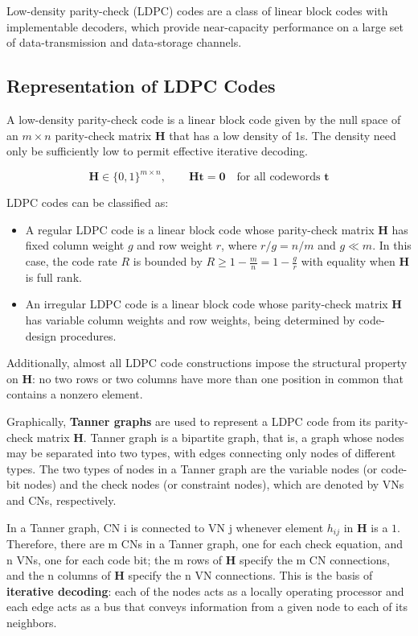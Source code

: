 \documentclass[11pt]{article}
\begin{document}
Low-density parity-check (LDPC) codes are a class of linear block codes with implementable decoders, which provide near-capacity performance on a large set of data-transmission and data-storage channels.

\subsection{Representation of LDPC Codes}

A low-density parity-check code is a linear block code given by the null space of an $m \times n$ parity-check matrix \textbf{H} that has a low density of 1s. The density need only be sufficiently low to permit effective iterative decoding.

\[
    \mathbf{H} \in \{0,1\}^{m \times n}, \qquad \mathbf{H}\mathbf{t} = \mathbf{0} \quad \text{for all codewords } \mathbf{t}
\]

LDPC codes can be classified as:
\begin{itemize}
  \item A regular LDPC code is a linear block code whose parity-check matrix \textbf{H} has fixed column weight $g$ and row weight $r$, where $r/g = n/m$ and $g \ll m$. In this case, the code rate $R$ is bounded by $R \geq 1 - \frac{m}{n} = 1 - \frac{g}{r}$ with equality when \textbf{H} is full rank.
  \item An irregular LDPC code is a linear block code whose parity-check matrix \textbf{H} has variable column weights and row weights, being determined by code-design procedures.
\end{itemize}

\noindent Additionally, almost all LDPC code constructions impose the structural property on \textbf{H}: no two rows or two columns have more than one position in common that contains a nonzero element.

Graphically, \textbf{Tanner graphs} are used to represent a LDPC code from its parity-check matrix \textbf{H}. Tanner graph is a bipartite graph, that is, a graph whose nodes may be separated into two types, with edges connecting only nodes of different types. The two types of nodes in a Tanner graph are the variable nodes (or code-bit nodes) and the check nodes (or constraint nodes), which are denoted by VNs and CNs, respectively.

In a Tanner graph, CN i is connected to VN j whenever element $h_{ij}$ in \textbf{H} is a $1$. Therefore, there are m CNs in a Tanner graph, one for each check equation, and n VNs, one for each code bit; the m rows of \textbf{H} specify the m CN connections, and the n columns of \textbf{H} specify the n VN connections. This is the basis of \textbf{iterative decoding}: each of the nodes acts as a locally operating processor and each edge acts as a bus that conveys information from a given node to each of its neighbors.
\end{document}

